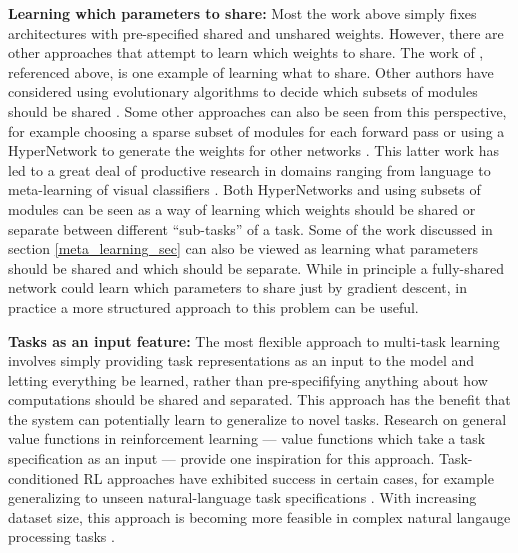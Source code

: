 \textbf{Learning which parameters to share:} Most the work above simply fixes architectures with pre-specified shared and unshared weights. However, there are other approaches that attempt to learn which weights to share. The work of \citet{Achille2018a}, referenced above, is one example of learning what to share. Other authors have considered using evolutionary algorithms to decide which subsets of modules should be shared \citep{Fernando2017}. Some other approaches can also be seen from this perspective, for example choosing a sparse subset of modules for each forward pass \citep{Shazeer2017} or using a HyperNetwork to generate the weights for other networks \citep{Ha2016}. This latter work has led to a great deal of productive research in domains ranging from language \citep{Platanios2017} to meta-learning of visual classifiers \citep{Garnelo2018, Li2019a}. Both HyperNetworks and using subsets of modules can be seen as a way of learning which weights should be shared or separate between different ``sub-tasks'' of a task. Some of the work discussed in section \ref{meta_learning_sec} can also be viewed as learning what parameters should be shared and which should be separate. While in principle a fully-shared network could learn which parameters to share just by gradient descent, in practice a more structured approach to this problem can be useful. \par 

\textbf{Tasks as an input feature:} The most flexible approach to multi-task learning involves simply providing task representations as an input to the model and letting everything be learned, rather than pre-specififying anything about how computations should be shared and separated. This approach has the benefit that the system can potentially learn to generalize to novel tasks. Research on general value functions in reinforcement learning \citep{Sutton2011} --- value functions which take a task specification as an input --- provide one inspiration for this approach. Task-conditioned RL approaches have exhibited success in certain cases, for example generalizing to unseen natural-language task specifications \citep{Hermann2017}. With increasing dataset size, this approach is becoming more feasible in complex natural langauge processing tasks \citep{Raffel2019}. \par

